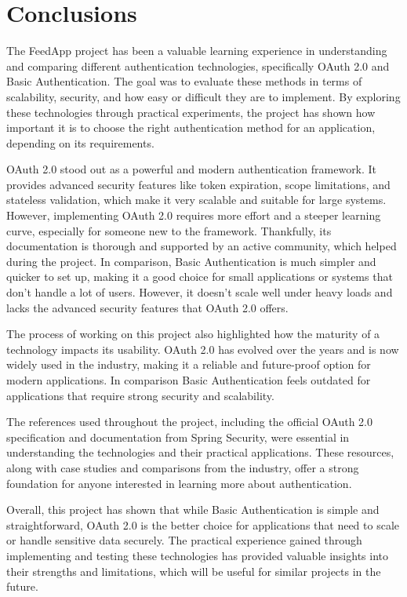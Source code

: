 \section{Conclusions}

The FeedApp project has been a valuable learning experience in understanding and comparing different authentication technologies, specifically OAuth 2.0 and Basic Authentication. The goal was to evaluate these methods in terms of scalability, security, and how easy or difficult they are to implement. By exploring these technologies through practical experiments, the project has shown how important it is to choose the right authentication method for an application, depending on its requirements.

OAuth 2.0 stood out as a powerful and modern authentication framework. It provides advanced security features like token expiration, scope limitations, and stateless validation, which make it very scalable and suitable for large systems. However, implementing OAuth 2.0 requires more effort and a steeper learning curve, especially for someone new to the framework. Thankfully, its documentation is thorough and supported by an active community, which helped during the project. In comparison, Basic Authentication is much simpler and quicker to set up, making it a good choice for small applications or systems that don’t handle a lot of users. However, it doesn’t scale well under heavy loads and lacks the advanced security features that OAuth 2.0 offers.

The process of working on this project also highlighted how the maturity of a technology impacts its usability. OAuth 2.0 has evolved over the years and is now widely used in the industry, making it a reliable and future-proof option for modern applications. In comparison Basic Authentication feels outdated for applications that require strong security and scalability.

The references used throughout the project, including the official OAuth 2.0 specification and documentation from Spring Security, were essential in understanding the technologies and their practical applications. These resources, along with case studies and comparisons from the industry, offer a strong foundation for anyone interested in learning more about authentication.

Overall, this project has shown that while Basic Authentication is simple and straightforward, OAuth 2.0 is the better choice for applications that need to scale or handle sensitive data securely. The practical experience gained through implementing and testing these technologies has provided valuable insights into their strengths and limitations, which will be useful for similar projects in the future.